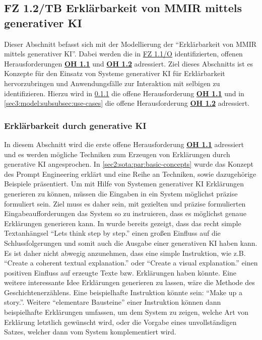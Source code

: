 \clearpage

\subsection[FZ 1.2/TB Erklärbarkeit von MMIR mittels generativer KI]{\texorpdfstring{FZ 1.2/TB Erklärbarkeit von MMIR mittels \\ generativer KI}{FZ 1.2/TB Erklärbarkeit von MMIR mittels generativer KI}}
\label{sec3:model:subsec:fz-explainability}
Dieser Abschnitt befasst sich mit der Modellierung der \enquote{Erklärbarkeit von MMIR mittels generativer KI}.
Dabei werden die in \hyperref[sec2:sota:subsec:fz-explainability]{FZ 1.1/O} identifizierten, offenen Herausforderungen \hyperref[sec2:sota:oi:1.1]{\textbf{OH 1.1}} und \hyperref[sec2:sota:oi:1.2]{\textbf{OH 1.2}} adressiert.
Ziel dieses Abschnitts ist es Konzepte für den Einsatz von Systeme generativer KI für Erklärbarkeit hervorzubringen und Anwendungsfälle zur Interaktion mit selbigen zu identifizieren.
Hierzu wird in \cref{sec3:model:subsubsec:explainability-through-genai} die offene Herausforderung \hyperref[sec2:sota:oi:1.1]{\textbf{OH 1.1}} und in \cref{sec3:model:subsubsec:use-cases} die offene Herausforderung \hyperref[sec2:sota:oi:1.2]{\textbf{OH 1.2}} adressiert.

\subsubsection{Erklärbarkeit durch generative KI}
\label{sec3:model:subsubsec:explainability-through-genai}
In diesem Abschnitt wird die erste offene Herausforderung \hyperref[sec2:sota:oi:1.1]{\textbf{OH 1.1}} adressiert und es werden mögliche Techniken zum Erzeugen von Erklärungen durch generative KI angesprochen.
In \cref{sec2:sota:par:basic-concepts} wurde das Konzept des Prompt Engineering erklärt und eine Reihe an Techniken, sowie dazugehörige Beispiele präsentiert.
Um mit Hilfe von Systemen generativer KI Erklärungen generieren zu können, müssen die Eingaben in ein System möglichst präzise formuliert sein.
Ziel muss es daher sein, mit gezielten und präzise formulierten Eingabeaufforderungen das System so zu instruieren, dass es möglichst genaue Erklärungen generieren kann.
In \cite{zero-shot-reasoners} wurde bereits gezeigt, dass das recht simple Textanhängsel \enquote{Lets think step by step.} einen großen Einfluss auf die Schlussfolgerungen und somit auch die Ausgabe einer generativen KI haben kann.
Es ist daher nicht abwegig anzunehmen, dass eine simple Instruktion, wie z.B. \enquote{Create a coherent textual explanation.} oder \enquote{Create a visual explanation.} einen positiven Einfluss auf erzeugte Texte bzw. Erklärungen haben könnte.
Eine weitere interessante Idee Erklärungen generieren zu lassen, wäre die Methode des Geschichtenerzählens.
Eine beispielhafte Instruktion könnte sein: \enquote{Make up a story.}.
Weitere \enquote{elementare Bausteine} einer Instruktion können dann beispielhafte Erklärungen umfassen, um dem System zu zeigen, welche Art von Erklärung letztlich gewünscht wird, oder die Vorgabe eines unvollständigen Satzes, welcher dann vom System komplementiert wird.


